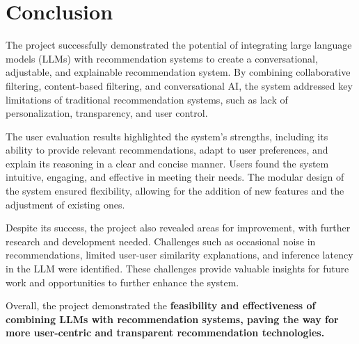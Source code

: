\section{Conclusion}
\label{sec:conclusion}
The project successfully demonstrated the potential of integrating large language models (LLMs) with recommendation systems to create a conversational, adjustable, and explainable recommendation system. By combining collaborative filtering, content-based filtering, and conversational AI, the system addressed key limitations of traditional recommendation systems, such as lack of personalization, transparency, and user control.

The user evaluation results highlighted the system's strengths, including its ability to provide relevant recommendations, adapt to user preferences, and explain its reasoning in a clear and concise manner. Users found the system intuitive, engaging, and effective in meeting their needs. The modular design of the system ensured flexibility, allowing for the addition of new features and the adjustment of existing ones.

Despite its success, the project also revealed areas for improvement, with further research and development needed. Challenges such as occasional noise in recommendations, limited user-user similarity explanations, and inference latency in the LLM were identified. These challenges provide valuable insights for future work and opportunities to further enhance the system.

Overall, the project demonstrated the \textbf{feasibility and effectiveness of combining LLMs with recommendation systems, paving the way for more user-centric and transparent recommendation technologies.}

